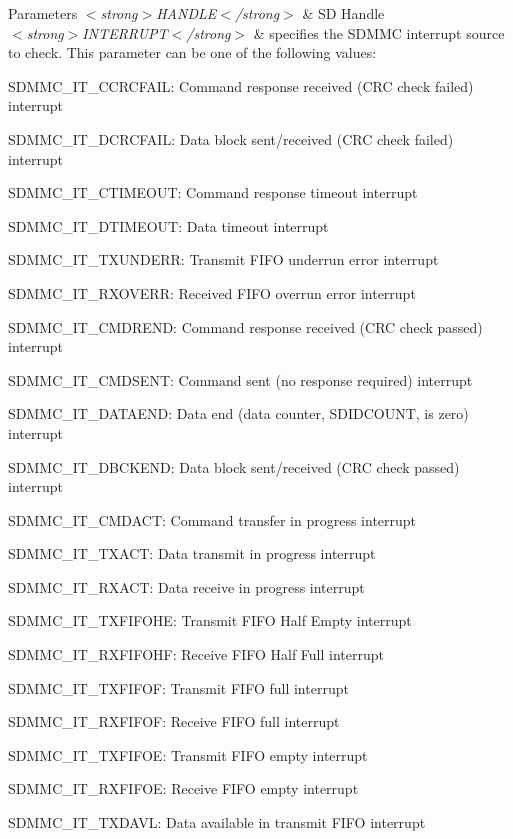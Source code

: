 \begin{DoxyParams}{Parameters}
{\em $<$strong$>$\+H\+A\+N\+D\+L\+E$<$/strong$>$} & SD Handle\\
\hline
{\em $<$strong$>$\+I\+N\+T\+E\+R\+R\+U\+P\+T$<$/strong$>$} & specifies the S\+D\+M\+MC interrupt source to check. This parameter can be one of the following values\+: \begin{DoxyItemize}
\item S\+D\+M\+M\+C\+\_\+\+I\+T\+\_\+\+C\+C\+R\+C\+F\+A\+IL\+: Command response received (C\+RC check failed) interrupt \item S\+D\+M\+M\+C\+\_\+\+I\+T\+\_\+\+D\+C\+R\+C\+F\+A\+IL\+: Data block sent/received (C\+RC check failed) interrupt \item S\+D\+M\+M\+C\+\_\+\+I\+T\+\_\+\+C\+T\+I\+M\+E\+O\+UT\+: Command response timeout interrupt \item S\+D\+M\+M\+C\+\_\+\+I\+T\+\_\+\+D\+T\+I\+M\+E\+O\+UT\+: Data timeout interrupt \item S\+D\+M\+M\+C\+\_\+\+I\+T\+\_\+\+T\+X\+U\+N\+D\+E\+RR\+: Transmit F\+I\+FO underrun error interrupt \item S\+D\+M\+M\+C\+\_\+\+I\+T\+\_\+\+R\+X\+O\+V\+E\+RR\+: Received F\+I\+FO overrun error interrupt \item S\+D\+M\+M\+C\+\_\+\+I\+T\+\_\+\+C\+M\+D\+R\+E\+ND\+: Command response received (C\+RC check passed) interrupt \item S\+D\+M\+M\+C\+\_\+\+I\+T\+\_\+\+C\+M\+D\+S\+E\+NT\+: Command sent (no response required) interrupt \item S\+D\+M\+M\+C\+\_\+\+I\+T\+\_\+\+D\+A\+T\+A\+E\+ND\+: Data end (data counter, S\+D\+I\+D\+C\+O\+U\+NT, is zero) interrupt \item S\+D\+M\+M\+C\+\_\+\+I\+T\+\_\+\+D\+B\+C\+K\+E\+ND\+: Data block sent/received (C\+RC check passed) interrupt \item S\+D\+M\+M\+C\+\_\+\+I\+T\+\_\+\+C\+M\+D\+A\+CT\+: Command transfer in progress interrupt \item S\+D\+M\+M\+C\+\_\+\+I\+T\+\_\+\+T\+X\+A\+CT\+: Data transmit in progress interrupt \item S\+D\+M\+M\+C\+\_\+\+I\+T\+\_\+\+R\+X\+A\+CT\+: Data receive in progress interrupt \item S\+D\+M\+M\+C\+\_\+\+I\+T\+\_\+\+T\+X\+F\+I\+F\+O\+HE\+: Transmit F\+I\+FO Half Empty interrupt \item S\+D\+M\+M\+C\+\_\+\+I\+T\+\_\+\+R\+X\+F\+I\+F\+O\+HF\+: Receive F\+I\+FO Half Full interrupt \item S\+D\+M\+M\+C\+\_\+\+I\+T\+\_\+\+T\+X\+F\+I\+F\+OF\+: Transmit F\+I\+FO full interrupt \item S\+D\+M\+M\+C\+\_\+\+I\+T\+\_\+\+R\+X\+F\+I\+F\+OF\+: Receive F\+I\+FO full interrupt \item S\+D\+M\+M\+C\+\_\+\+I\+T\+\_\+\+T\+X\+F\+I\+F\+OE\+: Transmit F\+I\+FO empty interrupt \item S\+D\+M\+M\+C\+\_\+\+I\+T\+\_\+\+R\+X\+F\+I\+F\+OE\+: Receive F\+I\+FO empty interrupt \item S\+D\+M\+M\+C\+\_\+\+I\+T\+\_\+\+T\+X\+D\+A\+VL\+: Data available in transmit F\+I\+FO interrupt \item 
\end{DoxyItemize}
\end{DoxyParams}
